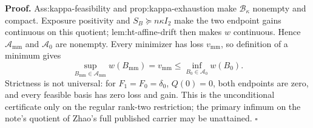 \textbf{Proof.}
Ass:kappa-feasibility and prop:kappa-exhaustion make \(\mathcal B_\kappa\) nonempty and compact.  Exposure positivity and \(S_B\succeq n\kappa I_2\) make the two endpoint gains continuous on this quotient; lem:ht-affine-drift then makes \(w\) continuous.  Hence \(\mathcal A_{\mathrm{mm}}\) and \(\mathcal A_0\) are nonempty.  Every minimizer has loss \(v_{\mathrm{mm}}\), so definition of a minimum gives
\[
\sup_{B_{\mathrm{mm}}\in\mathcal A_{\mathrm{mm}}}w(B_{\mathrm{mm}})
=v_{\mathrm{mm}}
\le\inf_{B_0\in\mathcal A_0}w(B_0).
\]
Strictness is not universal: for \(F_1=F_0=\delta_0\), \(Q(0)=0\), both endpoints are zero, and every feasible basis has zero loss and gain.  This is the unconditional certificate only on the regular rank-two restriction; the primary infimum on the note's quotient of Zhao's full published carrier may be unattained. \(\square\)